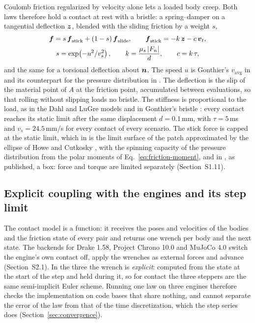 Coulomb friction regularized by velocity alone lets a loaded body creep. Both laws therefore
hold a contact at rest with a bristle: a spring--damper on a tangential deflection $\boldsymbol{z}$,
blended with the sliding friction by a weight $s$,
\begin{equation}
\begin{gathered}
  \boldsymbol{f} = s\,\boldsymbol{f}_\mathrm{stick} + (1-s)\,\boldsymbol{f}_\mathrm{slide},
  \qquad \boldsymbol{f}_\mathrm{stick} = -k\,\boldsymbol{z} - c\,\boldsymbol{v}_t, \\
  s = \exp\!\left(-u^2/v_s^2\right),
  \qquad k = \frac{\mu_s\,|F_n|}{d}, \qquad c = k\,\tau ,
\end{gathered}
  \label{eq:stick}
\end{equation}
and the same for a torsional deflection about $\boldsymbol{n}$. The speed $u$ is Gonthier's
$v_\mathrm{avg}$ in  and its counterpart for the pressure distribution in
. The deflection is the slip of the material point of $A$ at the friction
point, accumulated between evaluations, so that rolling without slipping loads no bristle. The
stiffness is proportional to the load, as in the Dahl and LuGre models and in Gonthier's
bristle \cite{Gonthier2007thesis}: every contact reaches its static limit after the same
displacement $d = 0.1$\,mm, with $\tau = 5$\,ms and $v_s = 24.5$\,mm/s for every contact of
every scenario. The stick force is capped at the static limit, which in  is
the limit surface of the patch approximated by the ellipse of Howe and Cutkosky
\cite{Howe1996}, with the spinning capacity of the pressure distribution from the polar moments
of Eq.~\eqref{eq:friction-moment}, and in , as published, a box: force and torque
are limited separately (Section~S1.11).

\subsection{Explicit coupling with the engines and its step limit}\label{sec:coupling}

The contact model is a function: it receives the poses and velocities of the bodies and the
friction state of every pair and returns one wrench per body and the next state. The backends
for Drake 1.58, Project Chrono 10.0 and MuJoCo 4.0 switch the engine's own contact off, apply
the wrenches as external forces and advance (Section~S2.1). In the three the wrench is
\emph{explicit}: computed from the state at the start of the step and held during it, so for
contact the three steppers are the same semi-implicit Euler scheme. Running one law on three
engines therefore checks the implementation on code bases that share nothing, and cannot
separate the error of the law from that of the time discretization, which the step series does
(Section~\ref{sec:convergence}).

